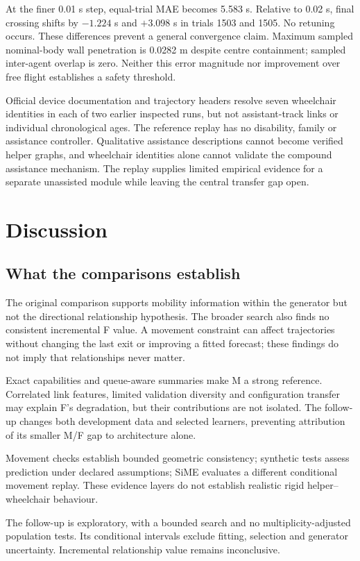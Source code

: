 \documentclass[conference]{IEEEtran}
\begin{document}
At the finer 0.01 s step, equal-trial MAE becomes 5.583 s. Relative to 0.02 s, final crossing shifts by $-1.224$ s and $+3.098$ s in trials 1503 and 1505. No retuning occurs. These differences prevent a general convergence claim. Maximum sampled nominal-body wall penetration is 0.0282 m despite centre containment; sampled inter-agent overlap is zero. Neither this error magnitude nor improvement over free flight establishes a safety threshold.

Official device documentation and trajectory headers resolve seven wheelchair identities in each of two earlier inspected runs, but not assistant-track links or individual chronological ages. The reference replay has no disability, family or assistance controller. Qualitative assistance descriptions cannot become verified helper graphs, and wheelchair identities alone cannot validate the compound assistance mechanism. The replay supplies limited empirical evidence for a separate unassisted module while leaving the central transfer gap open.

\section{Discussion}
\subsection{What the comparisons establish}
The original comparison supports mobility information within the generator but not the directional relationship hypothesis. The broader search also finds no consistent incremental F value. A movement constraint can affect trajectories without changing the last exit or improving a fitted forecast; these findings do not imply that relationships never matter.

Exact capabilities and queue-aware summaries make M a strong reference. Correlated link features, limited validation diversity and configuration transfer may explain F's degradation, but their contributions are not isolated. The follow-up changes both development data and selected learners, preventing attribution of its smaller M/F gap to architecture alone.

Movement checks establish bounded geometric consistency; synthetic tests assess prediction under declared assumptions; SiME evaluates a different conditional movement replay. These evidence layers do not establish realistic rigid helper--wheelchair behaviour.

The follow-up is exploratory, with a bounded search and no multiplicity-adjusted population tests. Its conditional intervals exclude fitting, selection and generator uncertainty. Incremental relationship value remains inconclusive.
\end{document}

